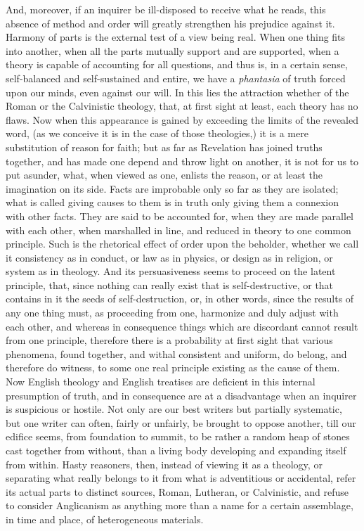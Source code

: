 And, moreover, if an inquirer be ill-disposed to
receive what he reads, this absence of method and order will greatly
strengthen his prejudice against it. Harmony of parts is the external
test of a view being real. When one thing fits into another, when all
the parts mutually support and are supported, when a theory is capable
of accounting for all questions, and thus is, in a certain sense,
self-balanced and self-sustained and entire, we have a \emph{phantasia}
of truth forced upon our minds, even against our will. In this lies
the attraction whether of the Roman or the Calvinistic theology, that,
at first sight at least, each theory has no flaws. Now when this
appearance is gained by exceeding the limits of the revealed word, (as
we conceive it is in the case of those theologies,) it is a mere
substitution of reason for faith; but as far as Revelation has joined
truths together, and has made one depend and throw light on another,
it is not for us to put asunder, what, when viewed as one, enlists the
reason, or at least the imagination on its side. Facts are improbable
only so far as they are isolated; what is called giving causes to them
is in truth only giving them a connexion with other facts. They are
said to be accounted for, when they are made parallel with each other,
when marshalled in line, and reduced in theory to one common
principle. Such is the rhetorical effect of order upon the beholder,
whether we call it consistency as in conduct, or law as in physics, or
design as in religion, or system as in theology. And its
persuasiveness seems to proceed on the latent principle, that, since
nothing can really exist that is self-destructive, or that contains in
it the seeds of self-destruction, or, in other words, since the
results of any one thing must, as proceeding from one, harmonize and
duly adjust with each other, and whereas in consequence things which
are discordant cannot result from one principle, therefore there is a
probability at first sight that various phenomena, found together, and
withal consistent and uniform, do belong, and therefore do witness, to
some one real principle existing as the cause of them. Now English
theology and English treatises are deficient in this internal
presumption of truth, and in consequence are at a disadvantage when an
inquirer is suspicious or hostile. Not only are our best writers but
partially systematic, but one writer can often, fairly or unfairly, be
brought to oppose another, till our edifice seems, from foundation to
summit, to be rather a random heap of stones cast together from
without, than a living body developing and expanding itself from
within. Hasty reasoners, then, instead of viewing it as a theology, or
separating what really belongs to it from what is adventitious or
accidental, refer its actual parts to distinct sources, Roman,
Lutheran, or Calvinistic, and refuse to consider Anglicanism as
anything more than a name for a certain assemblage, in time and place,
of heterogeneous materials.

